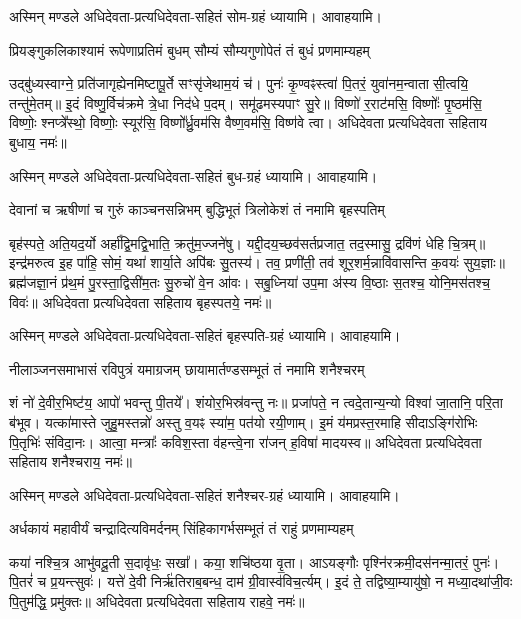अस्मिन् मण्डले अधिदेवता-प्रत्यधिदेवता-सहितं सोम-ग्रहं ध्यायामि। आवाहयामि।


\twolineshloka
{प्रियङ्गुकलिकाश्यामं रूपेणाप्रतिमं बुधम्}
{सौम्यं सौम्यगुणोपेतं तं बुधं प्रणमाम्यहम्}

उद्बु॑ध्यस्वाग्ने॒ प्रति॑जागृह्येनमिष्टापू॒र्ते सꣳसृ॑जेथाम॒यं च॑। पुनः॑ कृ॒ण्वꣴस्त्वा॑ पि॒तरं॒
युवा॑नम॒न्वातासी॒त्वयि॒ तन्तु॑मे॒तम्॥ इ॒दं विष्णु॒र्विच॑क्रमे त्रे॒धा निद॑धे प॒दम्। समू॑ढमस्यपाꣳ
सु॒रे॥ विष्णो॑ र॒राट॑मसि॒ विष्णोः᳚ पृ॒ष्ठम॑सि॒ विष्णोः॒ श्नप्त्रे᳚स्थो॒ विष्णोः॒ स्यूर॑सि॒
विष्णो᳚र्ध्रु॒वम॑सि वैष्ण॒वम॑सि॒ विष्ण॑वे त्वा।  अधिदेवता प्रत्यधिदेवता सहिताय बुधाय॒ नमः॑॥ 

अस्मिन् मण्डले अधिदेवता-प्रत्यधिदेवता-सहितं बुध-ग्रहं ध्यायामि। आवाहयामि।


\twolineshloka
{देवानां च ऋषीणां च गुरुं काञ्चनसन्निभम्}
{बुद्धिभूतं त्रिलोकेशं तं नमामि बृहस्पतिम्}

बृह॑स्पते॒ अति॒यद॒र्यो अर्हा᳚द्वि॒मद्वि॒भाति॒ क्रतु॑म॒ज्जने॑षु। यद्दी॒दय॒च्छव॑सर्त\-प्रजात॒
तद॒स्मासु॒ द्रवि॑णं धेहि चि॒त्रम्॥ इन्द्र॑मरुत्व इ॒ह पा॑हि॒ सोमं॒ यथा॑ शार्या॒ते अपि॑बः सु॒तस्य॑।
तव॒ प्रणी॑ती॒ तव॑ शूर॒शर्म॒न्नावि॑वासन्ति क॒वयः॑ सुय॒ज्ञाः॥ ब्रह्म॑जज्ञा॒नं प्र॑थ॒मं
पु॒रस्ता॒द्विसी॑म॒तः सु॒रुचो॑ वे॒न आ॑वः। सबु॒ध्निया॑ उप॒मा अ॑स्य वि॒ष्ठाः स॒तश्च॒ योनि॒मस॑तश्च॒
विवः॑॥ अधिदेवता प्रत्यधिदेवता सहिताय बृहस्पतये॒ नमः॑॥ 

अस्मिन् मण्डले अधिदेवता-प्रत्यधिदेवता-सहितं बृहस्पति-ग्रहं ध्यायामि। आवाहयामि।

\twolineshloka
{नीलाञ्जनसमाभासं रविपुत्रं यमाग्रजम्}
{छायामार्तण्डसम्भूतं तं नमामि शनैश्चरम्}

शं नो॑ दे॒वीर॒भिष्ट॑य॒ आपो॑ भवन्तु पी॒तये᳚। शंयोर॒भिस्र॑वन्तु नः॥ प्रजा॑पते॒ न त्वदे॒तान्य॒न्यो
विश्वा॑ जा॒तानि॒ परि॒ता ब॑भूव। यत्का॑मास्ते जुहु॒मस्तन्नो॑ अस्तु व॒यꣴ स्या॑म॒ पत॑यो रयी॒णाम्। इ॒मं
य॑मप्रस्त॒रमाहि सीदाऽङ्गि॑रोभिः पि॒तृभिः॑ संविदा॒नः। आत्वा॒ मन्त्राः᳚ कविश॒स्ता व॑हन्त्वे॒ना रा॑जन्
ह॒विषा॑ मादयस्व॥  अधिदेवता प्रत्यधिदेवता सहिताय शनैश्चराय॒ नमः॑॥ 

अस्मिन् मण्डले अधिदेवता-प्रत्यधिदेवता-सहितं शनैश्चर-ग्रहं ध्यायामि। आवाहयामि।

\twolineshloka
{अर्धकायं महावीर्यं चन्द्रादित्यविमर्दनम्}
{सिंहिकागर्भसम्भूतं तं राहुं प्रणमाम्यहम्}

कया॑ नश्चि॒त्र आभु॑वदू॒ती स॒दावृ॑धः॒ सखा᳚। कया॒ शचि॑ष्ठया वृ॒ता। आऽयङ्गौः
पृश्नि॑रक्रमी॒दस॑नन्मा॒तरं॒ पुनः॑। पि॒तरं॑ च प्र॒यन्त्सुवः॑। यत्ते॑ दे॒वी निर्ऋ॑तिराब॒बन्ध॒ दाम॑
ग्री॒वास्व॑विच॒र्त्यम्। इ॒दं  ते॒ तद्विष्या॒म्यायु॑षो॒ न मध्या॒दथा॑जी॒वः पि॒तुम॑द्धि॒ प्रमु॑क्तः॥ 
अधिदेवता प्रत्यधिदेवता सहिताय राहवे॒ नमः॑॥ 


